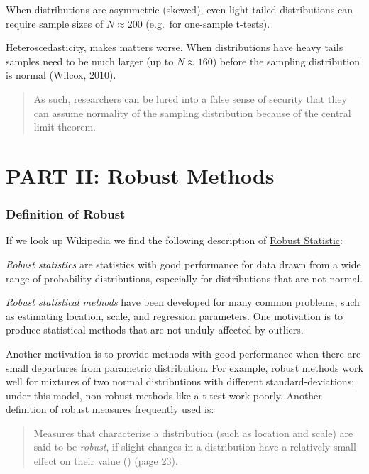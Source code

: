 \documentclass[
]{article}
\begin{document}
When distributions are asymmetric (skewed), even light-tailed distributions can require sample sizes of \(N \approx 200\) (e.g.~for one-sample t-tests).

Heteroscedasticity, makes matters worse. When distributions have heavy tails samples need to be much larger (up to \(N \approx 160\)) before the sampling distribution is normal (Wilcox, 2010).

\begin{quote}
As such, researchers can be lured into a false sense of security that they can assume normality of the sampling distribution because of the central limit theorem.
\end{quote}

\part*{PART II: Robust Methods}\label{part-part-ii-robust-methods}

\section*{Definition of Robust}\label{definition-of-robust}

If we look up Wikipedia we find the following description of \href{https://en.wikipedia.org/wiki/Robust_statistics}{Robust Statistic}:

\emph{Robust statistics} are statistics with good performance for data drawn from a wide range of probability distributions, especially for distributions that are not normal.

\emph{Robust statistical methods} have been developed for many common problems, such as estimating location, scale, and regression parameters. One motivation is to produce statistical methods that are not unduly affected by outliers.

Another motivation is to provide methods with good performance when there are small departures from parametric distribution. For example, robust methods work well for mixtures of two normal distributions with different standard-deviations; under this model, non-robust methods like a t-test work poorly. Another definition of robust measures frequently used is:

\begin{quote}
Measures that characterize a distribution (such as location and scale) are said to be \emph{robust}, if slight changes in a distribution have a relatively small effect on their value () (page 23).
\end{quote}
\end{document}
